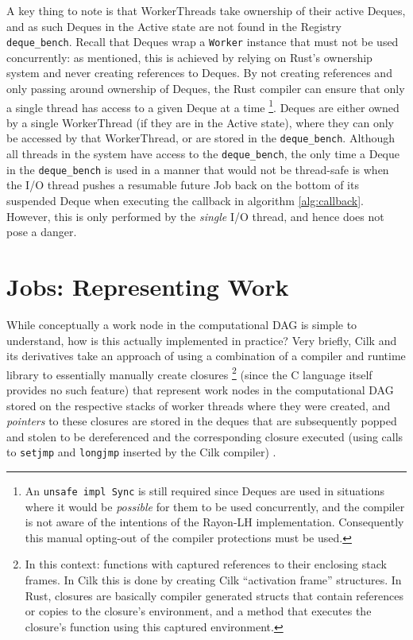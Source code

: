 \documentclass[bsc,frontabs,singlespacing,parskip,deptreport,normalheadings]{infthesis}
\begin{document}
A key thing to note is that WorkerThreads take ownership of their active Deques,
and as such Deques in the Active state are not found in the Registry
\texttt{deque\_bench}. Recall that Deques wrap a \texttt{Worker} instance that
must not be used concurrently: as mentioned, this is achieved by relying on
Rust's ownership system and never creating references to Deques. By not creating
references and only passing around ownership of Deques, the Rust compiler can
ensure that only a single thread has access to a given Deque at a time
\footnote{An \texttt{unsafe impl Sync} is still required since Deques are used
in situations where it would be \textit{possible} for them to be used
concurrently, and the compiler is not aware of the intentions of the Rayon-LH
implementation. Consequently this manual opting-out of the compiler protections
must be used.}. Deques are either owned by a single WorkerThread (if they are in
the Active state), where they can only be accessed by that WorkerThread, or are
stored in the \texttt{deque\_bench}. Although all threads in the system have
access to the \texttt{deque\_bench}, the only time a Deque in the
\texttt{deque\_bench} is used in a manner that would not be thread-safe is when
the I/O thread pushes a resumable future Job back on the bottom of its suspended
Deque when executing the callback in algorithm \ref{alg:callback}. However, this
is only performed by the \textit{single} I/O thread, and hence does not pose a
danger.

\section{Jobs: Representing Work}
\label{section:jobs:_representing_work}

While conceptually a work node in the computational DAG is simple to understand,
how is this actually implemented in practice? Very briefly, Cilk and its
derivatives take an approach of using a combination of a compiler and runtime
library to essentially manually create closures \footnote{In this context:
    functions with captured references to their enclosing stack frames. In Cilk
    this is done by creating Cilk ``activation frame'' structures. In Rust,
    closures are basically compiler generated structs that contain references or
copies to the closure's environment, and a method that executes the closure's
function using this captured environment.} (since the C language itself provides
no such feature) that represent work nodes in the computational DAG stored on
the respective stacks of worker threads where they were created, and
\textit{pointers} to these closures are stored in the deques that are
subsequently popped and stolen to be dereferenced and the corresponding closure
executed (using calls to \texttt{setjmp} and \texttt{longjmp} inserted by the
Cilk compiler) \cite{frigo_implementation_1998}.
\end{document}
